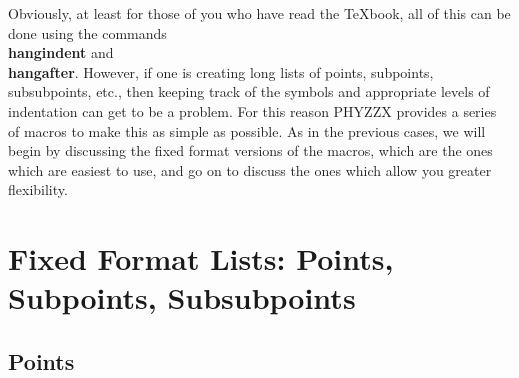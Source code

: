 Obviously, at least for those of you who have read the \TeX book,
all of this can be done using the commands {\bf \\hangindent}
and {\bf \\hangafter}.
However, if one is creating long lists of points, subpoints,
subsubpoints, etc., then keeping track of the symbols and
appropriate levels of indentation can get to be a problem.
For this reason PHYZZX provides a series of macros to make this as simple
as possible.
As in the previous cases, we will begin by discussing the
fixed format versions of the macros, which are the ones which are easiest
to use, and go on to discuss the ones which allow you greater flexibility.
 
\section{Fixed Format Lists: Points, Subpoints, Subsubpoints}
 
\subsection{Points}
 
